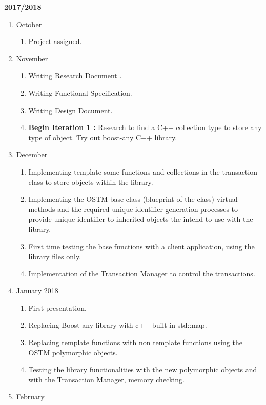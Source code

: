 \documentclass[12pt]{article}
\begin{document}
\textbf{2017/2018 }
\begin{enumerate}[label*=\arabic*.]
\item October
\begin{enumerate}[label*=\arabic*.]
	\item Project assigned.
\end{enumerate}
\item November
\begin{enumerate}[label*=\arabic*.]
	\item Writing Research Document .
	\item Writing Functional Specification.
	\item Writing Design Document.
	\item \textbf{Begin Iteration 1 :} Research to find a C++ collection type to store any type of object. Try out boost-any C++ library.
\end{enumerate}
\item December 
\begin{enumerate}[label*=\arabic*.]
	\item Implementing template some functions and collections in the transaction class to store objects within the library. 
	\item Implementing the OSTM base class (blueprint of the class) virtual methods and the required unique identifier generation processes to provide unique identifier to inherited objects the intend to use with the library.
	\item First time testing the base functions with a client application, using the library files only.
	\item Implementation of the Transaction Manager to control the transactions.
\end{enumerate}
\item January 2018
\begin{enumerate}[label*=\arabic*.]
	\item First presentation.
	\item Replacing Boost any library with c++ built in std::map.
	\item Replacing template functions with non template functions using the OSTM polymorphic objects.
	\item Testing the library functionalities with the new polymorphic objects and with the Transaction Manager, memory checking.
\end{enumerate}
\item February
\begin{enumerate}[label*=\arabic*.]

\end{enumerate}
\end{enumerate}
\end{document}
